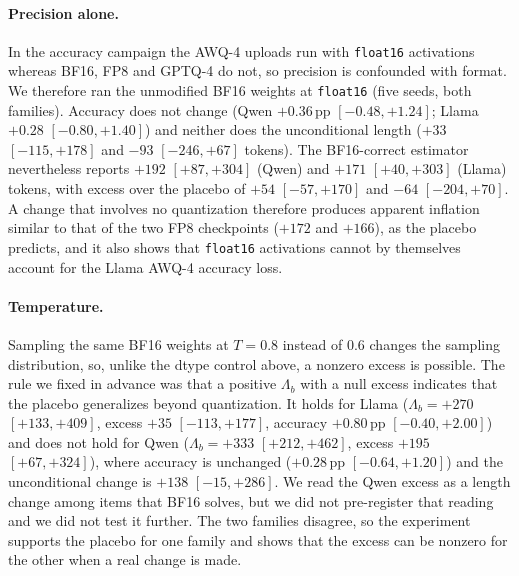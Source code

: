 \documentclass[11pt,a4paper]{article}
\begin{document}
\paragraph{Precision alone.} In the accuracy campaign the AWQ-4 uploads run with \texttt{float16} activations whereas BF16, FP8 and GPTQ-4 do not, so precision is confounded with format. We therefore ran the unmodified BF16 weights at \texttt{float16} (five seeds, both families). Accuracy does not change (Qwen $+0.36$\,pp $[-0.48,+1.24]$; Llama $+0.28$ $[-0.80,+1.40]$) and neither does the unconditional length ($+33$ $[-115,+178]$ and $-93$ $[-246,+67]$ tokens). The BF16-correct estimator nevertheless reports $+192$ $[+87,+304]$ (Qwen) and $+171$ $[+40,+303]$ (Llama) tokens, with excess over the placebo of $+54$ $[-57,+170]$ and $-64$ $[-204,+70]$. A change that involves no quantization therefore produces apparent inflation similar to that of the two FP8 checkpoints ($+172$ and $+166$), as the placebo predicts, and it also shows that \texttt{float16} activations cannot by themselves account for the Llama AWQ-4 accuracy loss.

\paragraph{Temperature.} Sampling the same BF16 weights at $T=0.8$ instead of $0.6$ changes the sampling distribution, so, unlike the dtype control above, a nonzero excess is possible. The rule we fixed in advance was that a positive $\Lambda_b$ with a null excess indicates that the placebo generalizes beyond quantization. It holds for Llama ($\Lambda_b=+270$ $[+133,+409]$, excess $+35$ $[-113,+177]$, accuracy $+0.80$\,pp $[-0.40,+2.00]$) and does not hold for Qwen ($\Lambda_b=+333$ $[+212,+462]$, excess $+195$ $[+67,+324]$), where accuracy is unchanged ($+0.28$\,pp $[-0.64,+1.20]$) and the unconditional change is $+138$ $[-15,+286]$. We read the Qwen excess as a length change among items that BF16 solves, but we did not pre-register that reading and we did not test it further. The two families disagree, so the experiment supports the placebo for one family and shows that the excess can be nonzero for the other when a real change is made.
\end{document}
